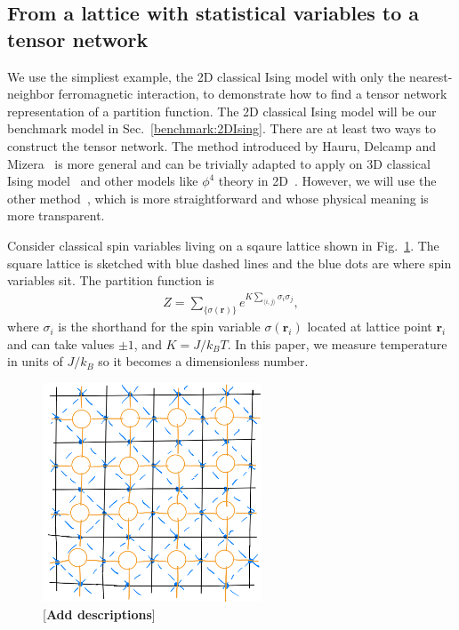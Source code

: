 \documentclass[aps,prb,reprint,superscriptaddress]{revtex4-2}
\begin{document}
\subsection{From a lattice with statistical variables to a tensor
network\label{spin2tensor}}
We use the simpliest example, the 2D classical Ising model with only the
nearest-neighbor ferromagnetic interaction, to demonstrate how to find a
tensor network representation of a partition function. The 2D classical
Ising model will be our benchmark model in Sec.~\ref{benchmark:2DIsing}.
There are at least two ways to construct the tensor network. The method
introduced by Hauru, Delcamp and Mizera~\cite{gilts} is more general and
can be trivially adapted to apply on 3D classical Ising
model~\cite{hotrg} and other models like $\phi^4$ theory in
2D~\cite{Delcamp2020}. However, we will use the other method~\cite{trg,
tnr}, which is more straightforward and whose physical meaning is more
transparent.
%

Consider classical spin variables living on a sqaure lattice shown in
Fig.~\ref{fig:spin2tensor}. The square lattice is sketched with blue
dashed lines and the blue dots are where spin variables sit. The
partition function is
%
\begin{align}\label{eq:2DIsingZ}
    Z = \sum_{\{\sigma(\mathbf{r})\}}e^{K\sum_{\langle i,j
        \rangle}\sigma_i \sigma_j},
\end{align}
where $\sigma_i$ is the shorthand for the spin variable
$\sigma(\mathbf{r}_i)$ located at lattice point $\mathbf{r}_i$ and can
take values $\pm 1$, and $K = J / k_B T$. In this paper, we measure
temperature in units of $J / k_B $ so it becomes a dimensionless number.
\begin{figure}[htb]
    \includegraphics[width=6.5cm]{./figs/spin2tensor}
    \caption{\label{fig:spin2tensor}[\textbf{Add descriptions}]}
\end{figure}
%
\end{document}
